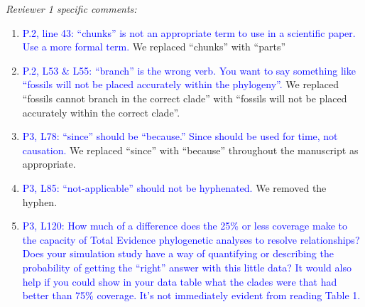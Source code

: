 \documentclass[12pt,letterpaper]{article}
\renewcommand{\subsection}[1]{%
\bigskip
\begin{center}
\begin{large}
\normalfont\itshape #1
\end{large}
\end{center}}
\begin{document}

\subsection{Reviewer 1 specific comments:}
\begin{enumerate}
\item{\textcolor{blue}{P.2, line 43: ``chunks'' is not an appropriate term to use in a scientific paper. Use a more formal term.}}
We replaced ``chunks'' with ``parts'' %

\item{\textcolor{blue}{P.2, L53 \& L55: ``branch'' is the wrong verb. You want to say something like ``fossils will not be placed accurately within the phylogeny''.}}
We replaced ``fossils cannot branch in the correct clade'' with ``fossils will not be placed accurately within the correct clade''.

\item{\textcolor{blue}{P3, L78: ``since'' should be ``because.'' Since should be used for time, not causation.}}
We replaced ``since'' with ``because'' throughout the manuscript as appropriate.

\item{\textcolor{blue}{P3, L85: ``not-applicable'' should not be hyphenated.}}
We removed the hyphen.

\item{\textcolor{blue}{P3, L120: How much of a difference does the 25\% or less coverage make to the capacity of Total Evidence phylogenetic analyses to resolve relationships? Does your simulation study have a way of quantifying or describing the probability of getting the ``right'' answer with this little data? It would also help if you could show in your data table what the clades were that had better than 75\% coverage. It's not immediately evident from reading Table 1.}}



\end{enumerate}
\end{document}
